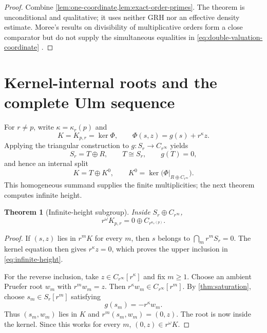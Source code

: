 \documentclass[11pt]{article}
\newtheorem{theorem}{Theorem}[section]
\theoremstyle{definition}
\begin{document}
\begin{proof}
Combine \cref{lem:one-coordinate,lem:exact-order-primes}.  The theorem is
unconditional and qualitative; it uses neither GRH nor an effective density
estimate.  Moree's results on divisibility of multiplicative orders form a
close comparator but do
not supply the simultaneous equalities in
\eqref{eq:double-valuation-coordinate} \citep{Moree2005}.
\end{proof}

\section{Kernel-internal roots and the complete Ulm sequence}\label{sec:ulm}

For $r\ne p$, write $\kappa=\kappa_r(p)$ and
\begin{equation}\label{eq:kernel}
K=K_{p,r}=\ker\Phi,
\qquad
\Phi(s,z)=g(s)+r^\kappa z.
\end{equation}
Applying the triangular construction to $g:S_r\to C_{r^\infty}$ yields
\begin{equation}\label{eq:killed-summand}
S_r=T\oplus R,
\qquad T\cong S_r,
\qquad g(T)=0,
\end{equation}
and hence an internal split
\begin{equation}\label{eq:K-split}
K=T\oplus K^0,
\qquad
K^0=\ker\bigl(\Phi|_{R\oplus C_{r^\infty}}\bigr).
\end{equation}
This homogeneous summand supplies the finite multiplicities; the next
theorem computes infinite height.

\begin{theorem}[Infinite-height subgroup]\label{thm:infinite-height}
Inside $S_r\oplus C_{r^\infty}$,
\begin{equation}\label{eq:infinite-height}
r^\omega K_{p,r}=0\oplus C_{r^{\kappa_r(p)}}.
\end{equation}
\end{theorem}

\begin{proof}
If $(s,z)$ lies in $r^mK$ for every $m$, then $s$ belongs to
$\bigcap_mr^mS_r=0$.  The kernel equation then gives $r^\kappa z=0$,
which proves the upper inclusion in \eqref{eq:infinite-height}.

For the reverse inclusion, take $z\in C_{r^\infty}[r^\kappa]$ and fix
$m\ge1$.  Choose an ambient Pruefer root $w_m$ with $r^mw_m=z$.  Then
$r^\kappa w_m\in C_{r^\infty}[r^m]$.  By \cref{thm:saturation}, choose
$s_m\in S_r[r^m]$ satisfying
\begin{equation}\label{eq:kernel-correction}
g(s_m)=-r^\kappa w_m.
\end{equation}
Thus $(s_m,w_m)$ lies in $K$ and
$r^m(s_m,w_m)=(0,z)$.  The root is now inside the kernel.  Since this works
for every $m$, $(0,z)\in r^\omega K$.
\end{proof}
\end{document}

